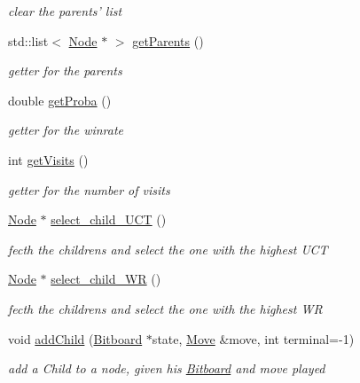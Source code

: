 \begin{DoxyCompactItemize}
\begin{DoxyCompactList}\small\item\em clear the parents' list \end{DoxyCompactList}\item 
std\+::list$<$ \hyperlink{classmcts_1_1_node}{Node} $\ast$ $>$ \hyperlink{classmcts_1_1_node_aa1670c2fae272a00356b88b6a8d382b9}{get\+Parents} ()
\begin{DoxyCompactList}\small\item\em getter for the parents \end{DoxyCompactList}\item 
double \hyperlink{classmcts_1_1_node_a15b5ee0530be2b48df18658f5caa0273}{get\+Proba} ()
\begin{DoxyCompactList}\small\item\em getter for the winrate \end{DoxyCompactList}\item 
int \hyperlink{classmcts_1_1_node_af93b8855df1ad7521b1b8a11ea21c410}{get\+Visits} ()
\begin{DoxyCompactList}\small\item\em getter for the number of visits \end{DoxyCompactList}\item 
\hyperlink{classmcts_1_1_node}{Node} $\ast$ \hyperlink{classmcts_1_1_node_a077c08375da809ea3e7169e827c93009}{select\+\_\+child\+\_\+\+U\+C\+T} ()
\begin{DoxyCompactList}\small\item\em fecth the childrens and select the one with the highest U\+C\+T \end{DoxyCompactList}\item 
\hyperlink{classmcts_1_1_node}{Node} $\ast$ \hyperlink{classmcts_1_1_node_aecba4d455461ba7966d50729fb920ebf}{select\+\_\+child\+\_\+\+W\+R} ()
\begin{DoxyCompactList}\small\item\em fecth the childrens and select the one with the highest W\+R \end{DoxyCompactList}\item 
void \hyperlink{classmcts_1_1_node_ab0e925fdf81bb182563e6f738f5cfa27}{add\+Child} (\hyperlink{class_bitboard}{Bitboard} $\ast$state, \hyperlink{class_move}{Move} \&move, int terminal=-\/1)
\begin{DoxyCompactList}\small\item\em add a Child to a node, given his \hyperlink{class_bitboard}{Bitboard} and move played \end{DoxyCompactList}\item 

\end{DoxyCompactItemize}
